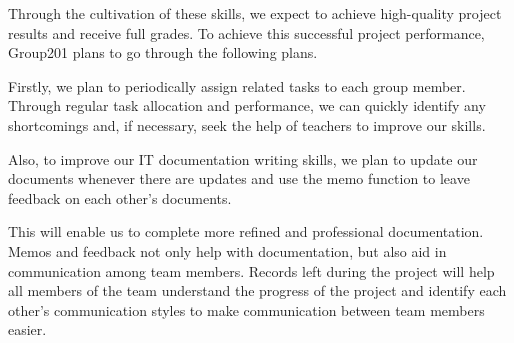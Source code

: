 \documentclass{article}
\begin{document}
Through the cultivation of these skills, we expect to achieve high-quality project results and receive full grades. To achieve this successful project performance, Group201 plans to go through the following plans.



Firstly, we plan to periodically assign related tasks to each group member. Through regular task allocation and performance, we can quickly identify any shortcomings and, if necessary, seek the help of teachers to improve our skills.



Also, to improve our IT documentation writing skills, we plan to update our documents whenever there are updates and use the memo function to leave feedback on each other's documents.



This will enable us to complete more refined and professional documentation. Memos and feedback not only help with documentation, but also aid in communication among team members. Records left during the project will help all members of the team understand the progress of the project and identify each other's communication styles to make communication between team members easier.
\end{document}
